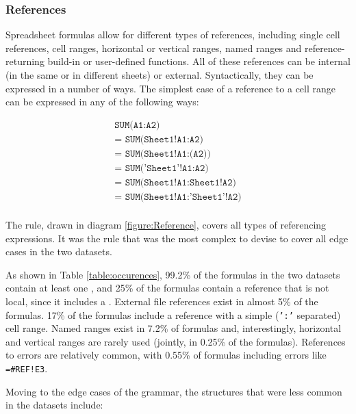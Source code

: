 \documentclass[conference]{IEEEtran}
\begin{document}
\subsubsection{References}

Spreadsheet formulas allow for different types of references, including single cell references, cell ranges, horizontal or vertical ranges, named ranges and reference-returning build-in or user-defined functions. All of these references can be internal (in the same or in different sheets) or external. Syntactically, they can be expressed in a number of ways. The simplest case of a reference to a cell range can be expressed in any of the following ways:

\begin{eqnarray*}
	\texttt{SUM(A1:A2)} \\ 
	\texttt{= SUM(Sheet1!A1:A2)} \\
	\texttt{= SUM(Sheet1!A1:(A2))} \\
	\texttt{= SUM('Sheet1'!A1:A2)} \\
	\texttt{= SUM(Sheet1!A1:Sheet1!A2)} \\
	\texttt{= SUM(Sheet1!A1:'Sheet1'!A2)} \\
\end{eqnarray*}

The  rule, drawn in diagram \ref{figure:Reference}, covers all types of referencing expressions. It was the rule that was the most complex to devise to cover all edge cases in the two datasets.

As shown in Table \ref{table:occurences}, 99.2\% of the formulas in the two datasets contain at least one , and 25\% of the formulas contain a reference that is not local, since it includes a . External file references exist in almost 5\% of the formulas. 17\% of the formulas include a reference with a simple (\texttt{':'} separated) cell range. Named ranges exist in 7.2\% of formulas and, interestingly, horizontal and vertical ranges are rarely used (jointly, in 0.25\% of the formulas). References to errors are relatively common, with 0.55\% of formulas including errors like \texttt{=\#REF!E3}.

Moving to the edge cases of the grammar, the structures that were less common in the datasets include:
\end{document}

